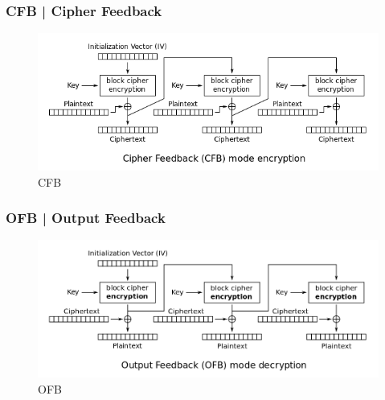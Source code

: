 
\subsubsection{CFB | Cipher Feedback}


\textsf{\small }

\begin{figure}[H]
	\centering
	\includegraphics[width=1\textwidth, height=1\textheight, keepaspectratio]{./images/aes_modes/cfb.png} %
	\caption{CFB}
	\label{fig:cfb}
\end{figure}

\subsubsection{OFB | Output Feedback}

\begin{figure}[H]
	\centering
	\includegraphics[width=1\textwidth, height=1\textheight, keepaspectratio]{./images/aes_modes/ofb.png} %
	\caption{OFB}
	\label{fig:ofb}
\end{figure}

